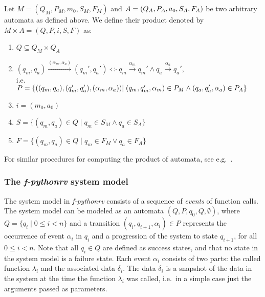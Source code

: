 \begin{mydef}
Let $M = (Q_M,P_M,m_0,S_M,F_M)$ and $A = (Q_A,P_A,\\a_0,S_A,F_A)$ be two
arbitrary automata as defined above. We define their product denoted by $M
\times A = (Q,P,i,S,F)$ as:

\begin{enumerate}
  \item $Q \subseteq Q_M \times Q_A$
  \item $(q_m,q_a) \xrightarrow{(\alpha_m,\alpha_a)} (q_m',q_a')
    \Leftrightarrow q_m \xrightarrow{\alpha_m} q_m' \wedge q_a \xrightarrow{\alpha_a} q_a'$,\\
    i.e.\\
    $P = \{((q_m,q_a),(q_m',q_a'),(\alpha_m,\alpha_a)) \\
    | \; (q_m,q_m',\alpha_m) \in P_M \wedge (q_a,q_a',\alpha_a) \in P_A\}$
  \item $i = (m_0,a_0)$
  \item $S = \{(q_m,q_a) \in Q \; | \; q_m \in S_M \wedge q_a \in S_A\}$
  \item $F = \{(q_m,q_a) \in Q \; | \; q_m \in F_M \vee q_a \in F_A\}$
\end{enumerate}

\end{mydef}

For similar procedures for computing the product of automata, see e.g.\
\cite{chaki04lks, schneider04kripke}.

\subsubsection{The \textit{f-pythonrv} system model}

The system model in \textit{f-pythonrv} consists of a sequence of
\textit{events} of function calls. The system model can be modeled as an
automata $(Q, P, q_0, Q, \emptyset)$, where $Q = \{q_i \; | \; 0 \leq i < n\}$
and a transition $(q_i, q_{i+1}, \alpha_i) \in P$ represents the occurrence of
event $\alpha_i$ in $q_i$ and a progression of the system to state $q_{i+1}$,
for all $0 \leq i < n$. Note that all $q_i \in  Q$ are defined as success
states, and that no state in the system model is a failure state. Each event
$\alpha_i$ consists of two parts: the called function $\lambda_i$ and the
associated data $\delta_i$. The data $\delta_i$ is a snapshot of the data in
the system at the time the function $\lambda_i$ was called, i.e.\ in a simple
case just the arguments passed as parameters.

